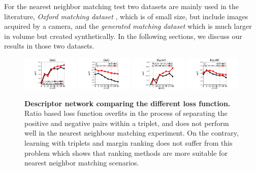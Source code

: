 For the nearest neighbor matching test two datasets are mainly used in
the literature, {\em Oxford matching dataset}
\cite{schmid2003performance}, which is of small size, but include
images acquired by a camera, and the {\em generated matching dataset}
\cite{FDB14} which is much larger in volume but created
synthetically. In the following sections, we discuss our results in
those two datasets.

\begin{figure}
\centering    
\includegraphics[trim={2.1cm 0 2.1cm 0},width=0.24\textwidth]{main/chapter02/images/dog_ranking}
\includegraphics[trim={2.1cm 0 2.1cm
0},width=0.24\textwidth]{main/chapter02/images/dog_ratio}
\includegraphics[trim={2.1cm 0 2.1cm 0},width=0.24\textwidth]{main/chapter02/images/haraff_ranking}
\includegraphics[trim={2.1cm 0 2.1cm 0},width=0.24\textwidth]{main/chapter02/images/haraff_ratio}
\caption[Descriptor network comparing the different loss function]{\textbf{Descriptor network comparing the different loss function.} Ratio based loss function overfits in the process of
   separating the positive and negative pairs within a
  triplet, and does not perform well in the nearest neighbour
  matching experiment. On the contrary, learning with triplets and
  margin ranking does not suffer from this problem which shows
  that ranking methods are more suitable for nearest neighbor
  matching scenarios.}
\label{fig:losses-vs}
\vspace{-0.1cm}
\end{figure}

